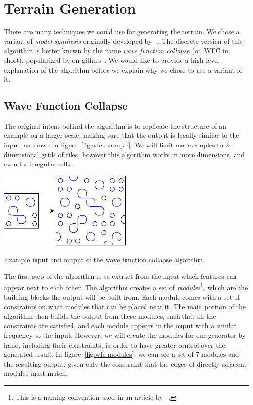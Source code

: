 \section{Terrain Generation}

There are many techniques we could use for generating the terrain.
We chose a variant of \emph{model synthesis} originally developed by ~\cite{ModelSynthesis}.
The discrete version of this algorithm is better known by the name \emph{wave function collapse} (or~WFC in short), popularized by  on github~\cite{WFC}.
We would like to provide a high-level explanation of the algorithm before we explain why we chose to use a variant of it.

\subsection{Wave Function Collapse}

The original intent behind the algorithm is to replicate the structure of an example on a larger scale, making sure that the output is locally similar to the input, as shown in figure~\ref{fig:wfc-example}.
We will limit our examples to 2-dimensional grids of tiles, however this algorithm works in more dimensions, and even for irregular cells.

\begin{center}
    \captionsetup{type=figure}
    \includegraphics[width=0.5\textwidth]{img/WFC Example.pdf}
    \caption{Example input and output of the wave function collapse algorithm.}
    \label{fig:wfc-example}
\end{center}

The first step of the algorithm is to extract from the input which features can appear next to each other.
The algorithm creates a set of \emph{modules}\footnote{This is a naming convention used in an article by ~\cite{WFCMarian}.}, which are the building blocks the output will be built from.
Each module comes with a set of constraints on what modules that can be placed near it.
The main portion of the algorithm then builds the output from these modules, such that all the constraints are satisfied, and each module appears in the ouput with a similar frequency to the input.
However, we will create the modules for our generator by hand, including their constraints, in order to have greater control over the generated result.
In figure~\ref{fig:wfc-modules}, we can see a set of 7 modules and the resulting output, given only the constraint that the edges of directly adjacent modules must match.

